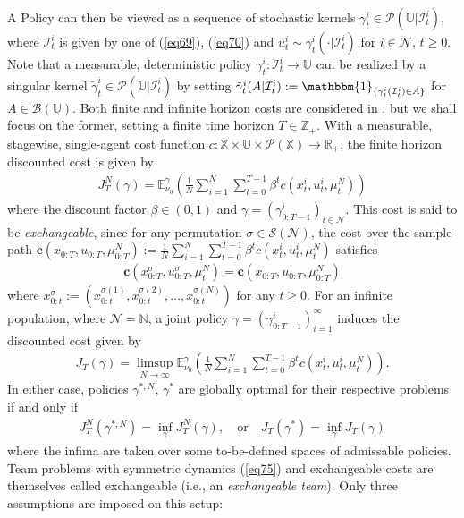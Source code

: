 \documentclass[12pt, oneside]{report}
\newcommand{\bs}[1]{\boldsymbol{#1}}
\newcommand{\mbb}[1]{\mathbb{#1}}
\newcommand{\1}[1]{\mathbbm{1}_{\{#1\}}}
\newcommand{\mc}[1]{\mathcal{#1}}
\theoremstyle{definition}
\begin{document}
A Policy can then be viewed as a sequence of stochastic kernels
$\gamma^i_t\in\mc{P}(\mbb{U}|\mc{I}^i_t)$, where $\mc{I}^i_t$ is given by one of
(\ref{eq69}), (\ref{eq70}) and $u^i_t\sim\gamma^i_t(\cdot|\mc{I}^i_t)$ for
$i\in\mc{N}$, $t\geq 0$. Note that a measurable, deterministic policy
$\gamma^i_t:\mc{I}^i_t\rightarrow\mbb{U}$ can be realized by a singular kernel
$\tilde{\gamma}^i_t\in\mc{P}(\mbb{U}|\mc{I}^i_t)$ by setting
$\tilde{\gamma}^i_t(A|\mc{I}^i_t):=\1{\gamma^i_t(\mc{I}^i_t)\in A}$ for
$A\in\mc{B}(\mbb{U})$. Both finite and infinite horizon costs are considered in
\cite{Sanjari_Saldi_Yüksel_2024}, but we shall focus on the former, setting a
finite time horizon $T\in\mbb{Z}_+$. With a measurable, stagewise, single-agent
cost function $c:\mbb{X}\times\mbb{U}\times\mc{P}(\mbb{X})\rightarrow\mbb{R}_+$,
the finite horizon discounted cost is given by
\begin{align}
    J^N_T(\gamma)=\mbb{E}^{\gamma}_{\nu_0}\left(\frac{1}{N}\sum_{i=1}^N\sum_{t=0}^{T-1}\beta^t c(x^i_t,u^i_t,\mu^N_t)\right)
\end{align}
where the discount factor $\beta\in(0,1)$ and
$\gamma=(\gamma^i_{0:T-1})_{i\in\mc{N}}$. This cost is said to be
\textit{exchangeable}, since for any permutation $\sigma\in\mc{S}(\mc{N})$, the
cost over the sample path
$\bs{c}(x_{0:T},u_{0:T},\mu^N_{0:T}):=\frac{1}{N}\sum_{i=1}^N\sum_{t=0}^{T-1}\beta^tc(x^i_t,u^i_t,\mu^N_t)$
satisfies
\begin{align}
    \bs{c}(x^\sigma_{0:T},u^\sigma_{0:T},\mu^N_t)=\bs{c}(x_{0:T},u_{0:T},\mu^N_{0:T})\label{eq74}
\end{align}
where
$x^\sigma_{0:t}:=(x^{\sigma(1)}_{0:t},x^{\sigma(2)}_{0:t},\dots,x^{\sigma(N)}_{0:t})$
for any $t\geq 0$. For an infinite population, where $\mc{N}=\mbb{N}$, a joint
policy $\gamma=(\gamma^i_{0:T-1})_{i=1}^\infty$ induces the discounted cost
given by
\begin{align}
    J_T(\gamma)=\limsup_{N\rightarrow\infty}\mbb{E}^\gamma_{\nu_0}\left(\frac{1}{N}\sum_{i=1}^N\sum_{t=0}^{T-1}\beta^t c(x^i_t,u^i_t,\mu^N_t)\right).
\end{align}
In either case, policies $\gamma^{\ast,N}$, $\gamma^\ast$ are globally optimal
for their respective problems if and only if
\begin{align}
    J^N_T(\gamma^{\ast,N})=\inf_\gamma J^N_T(\gamma),\quad\text{or}\quad J_T(\gamma^\ast)=\inf_\gamma J_T(\gamma)
\end{align}
where the infima are taken over some to-be-defined spaces of admissable
policies. Team problems with symmetric dynamics (\ref{eq75}) and exchangeable costs are themselves called exchangeable (i.e., an \textit{exchangeable team}). Only three assumptions are imposed on this setup:
\end{document}

